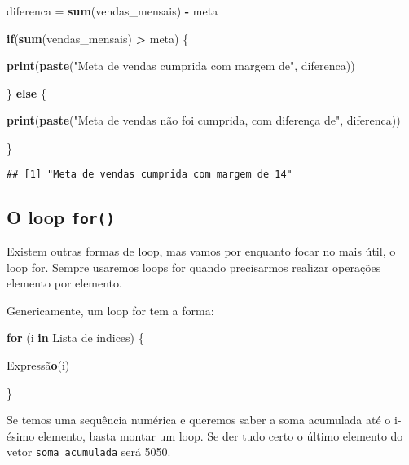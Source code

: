 \documentclass[]{article}
\newenvironment{Shaded}{\begin{snugshade}}{\end{snugshade}}
\newcommand{\ControlFlowTok}[1]{\textcolor[rgb]{0.13,0.29,0.53}{\textbf{#1}}}
\newcommand{\KeywordTok}[1]{\textcolor[rgb]{0.13,0.29,0.53}{\textbf{#1}}}
\newcommand{\NormalTok}[1]{#1}
\newcommand{\OperatorTok}[1]{\textcolor[rgb]{0.81,0.36,0.00}{\textbf{#1}}}
\newcommand{\StringTok}[1]{\textcolor[rgb]{0.31,0.60,0.02}{#1}}
\begin{document}
\begin{Shaded}
\begin{Highlighting}[]
\NormalTok{diferenca =}\StringTok{ }\KeywordTok{sum}\NormalTok{(vendas_mensais) }\OperatorTok{-}\StringTok{ }\NormalTok{meta}

\ControlFlowTok{if}\NormalTok{(}\KeywordTok{sum}\NormalTok{(vendas_mensais) }\OperatorTok{>}\StringTok{ }\NormalTok{meta) \{}
  
  \KeywordTok{print}\NormalTok{(}\KeywordTok{paste}\NormalTok{(}\StringTok{"Meta de vendas cumprida com margem de"}\NormalTok{, diferenca))}

\NormalTok{\} }\ControlFlowTok{else}\NormalTok{ \{}
  
  \KeywordTok{print}\NormalTok{(}\KeywordTok{paste}\NormalTok{(}\StringTok{"Meta de vendas não foi cumprida, com diferença de"}\NormalTok{, diferenca))  }
  
\NormalTok{  \}}
\end{Highlighting}
\end{Shaded}

\begin{verbatim}
## [1] "Meta de vendas cumprida com margem de 14"
\end{verbatim}

\hypertarget{o-loop-for}{%
\subsection{\texorpdfstring{O loop
\texttt{for()}}{O loop for()}}\label{o-loop-for}}

Existem outras formas de loop, mas vamos por enquanto focar no mais
útil, o loop for. Sempre usaremos loops for quando precisarmos realizar
operações elemento por elemento.

Genericamente, um loop for tem a forma:

\begin{Shaded}
\begin{Highlighting}[]
\ControlFlowTok{for}\NormalTok{ (i }\ControlFlowTok{in}\NormalTok{ Lista de índices) \{}
  
\NormalTok{  Expressã}\KeywordTok{o}\NormalTok{(i)}
  
\NormalTok{  \}}
\end{Highlighting}
\end{Shaded}

Se temos uma sequência numérica e queremos saber a soma acumulada até o
i-ésimo elemento, basta montar um loop. Se der tudo certo o último
elemento do vetor \texttt{soma\_acumulada} será 5050.
\end{document}
